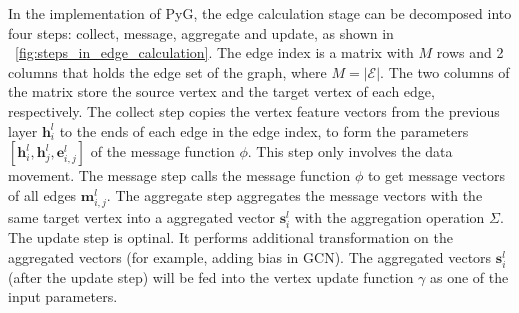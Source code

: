 In the implementation of PyG, the edge calculation stage can be decomposed into four steps: collect, message, aggregate and update, as shown in \figurename~\ref{fig:steps_in_edge_calculation}.
The edge index is a matrix with $M$ rows and 2 columns that holds the edge set of the graph, where $M=|\mathcal{E}|$.
The two columns of the matrix store the source vertex and the target vertex of each edge, respectively.
The collect step copies the vertex feature vectors from the previous layer $\boldsymbol{h}_i^l$ to the ends of each edge 
in the edge index, to form the parameters $[\boldsymbol{h}^l_i, \boldsymbol{h}^l_{j}, \boldsymbol{e}^l_{i,j}]$ of the message function $\phi$.
This step only involves the data movement.
The message step calls the message function $\phi$ to get message vectors of all edges $\boldsymbol{m}_{i, j}^l$.
The aggregate step aggregates the message vectors with the same target vertex into a aggregated vector $\boldsymbol{s}^l_i$ with the aggregation operation $\Sigma$.
The update step is optinal.
It performs additional transformation on the aggregated vectors (for example, adding bias in GCN).
The aggregated vectors $\boldsymbol{s}^l_i$ (after the update step) will be fed into the vertex update function $\gamma$ as one of the input parameters.

